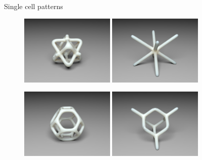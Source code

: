 \begin{frame}{Single cell patterns}
\begin{figure}
\hspace{\fill}
\includegraphics[width=0.4\textwidth]{Images/brick5_cell.png}
\hspace{\fill}
\includegraphics[width=0.4\textwidth]{Images/star_cell.png}
\hspace{\fill}

\vspace{3mm}
\hspace{\fill}
\includegraphics[width=0.4\textwidth]{Images/truncated_octahedron_cell.png}
\hspace{\fill}
\includegraphics[width=0.4\textwidth]{Images/diamond_cell.png}
\hspace{\fill}
\end{figure}
\end{frame}

